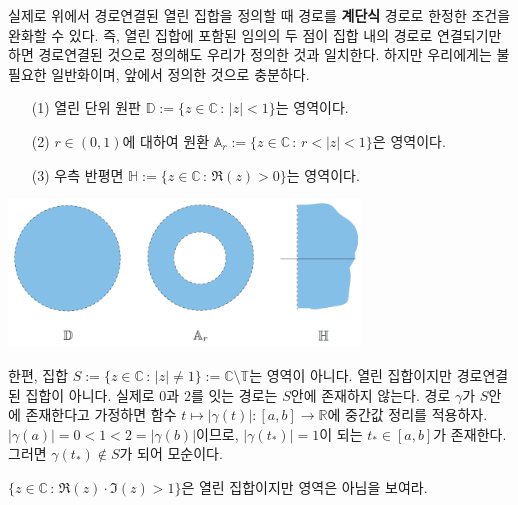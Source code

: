 실제로 위에서 경로연결된 열린 집합을 정의할 때 경로를 {\bf 계단식} 경로로 한정한 조건을 
완화할 수 있다. 즉, 열린 집합에 포함된 임의의 두 점이 집합 내의 경로로 연결되기만 하면
경로연결된 것으로 정의해도
우리가 정의한 것과 일치한다.
하지만 우리에게는 불필요한 일반화이며, 앞에서 정의한 것으로 충분하다.

\begin{saltexample}[label=example-1-3]{}{}

\begin{itemize}
\item[(1)] 열린 단위 원판 $\mathbb D := \{ z\in\mathbb C\,:\, |z|<1 \}$는 영역이다.
\item[(2)] $r\in (0,1)$에 대하여 원환 $\mathbb A_r := \{ z\in\mathbb C\,:\, r<|z|<1\}$은 영역이다.
\item[(3)] 우측 반평면 $\mathbb H := \{ z\in \mathbb C \,:\, \Re(z)>0\}$는 영역이다.
\end{itemize}

\begin{center}
\includegraphics[width=0.7\textwidth]{./SaltChapter/figs/fig-1-12}
\end{center}
\label{fig-1-12}
\end{saltexample}

한편, 집합 $S:=\{z\in\mathbb C \,:\, |z|\ne 1\} := \mathbb C\setminus \mathbb T$는 
영역이 아니다. 열린 집합이지만 경로연결된 집합이 아니다.
실제로 $0$과 $2$를 잇는 경로는 $S$안에 존재하지 않는다.
경로 $\gamma$가 $S$안에 존재한다고 가정하면
함수 $t\mapsto |\gamma(t)| : [a,b] \to \mathbb R$에
중간값 정리를 적용하자.
$|\gamma(a)| = 0 < 1<2 = |\gamma(b)|$이므로,
$|\gamma(t_*)|=1$이 되는 $t_*\in [a,b]$가 존재한다.
그러면 $\gamma(t_*)\not\in S$가 되어 모순이다.

\begin{salt_exercise} \label{ex-1-29}
$\{z\in \mathbb C \,:\, \Re(z) \cdot \Im(z) >1\}$은 열린 집합이지만
영역은 아님을 보여라.
\end{salt_exercise}

